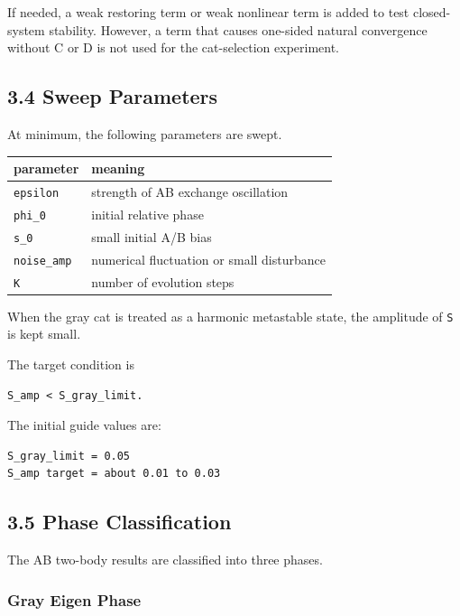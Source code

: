 \documentclass{article}
\newcounter{none}
\begin{document}
If needed, a weak restoring term or weak nonlinear term is added to test
closed-system stability. However, a term that causes one-sided natural
convergence without C or D is not used for the cat-selection experiment.

\subsection{3.4 Sweep Parameters}\label{sweep-parameters}

At minimum, the following parameters are swept.

{\def\LTcaptype{none} %
\begin{longtable}[]{@{}ll@{}}
\toprule\noalign{}
parameter & meaning \\
\midrule\noalign{}
\endhead
\bottomrule\noalign{}
\endlastfoot
\texttt{epsilon} & strength of AB exchange oscillation \\
\texttt{phi\_0} & initial relative phase \\
\texttt{s\_0} & small initial A/B bias \\
\texttt{noise\_amp} & numerical fluctuation or small disturbance \\
\texttt{K} & number of evolution steps \\
\end{longtable}
}

When the gray cat is treated as a harmonic metastable state, the
amplitude of \texttt{S} is kept small.

The target condition is

\begin{verbatim}
S_amp < S_gray_limit.
\end{verbatim}

The initial guide values are:

\begin{verbatim}
S_gray_limit = 0.05
S_amp target = about 0.01 to 0.03
\end{verbatim}

\subsection{3.5 Phase Classification}\label{phase-classification}

The AB two-body results are classified into three phases.

\subsubsection{Gray Eigen Phase}\label{gray-eigen-phase}
\end{document}
